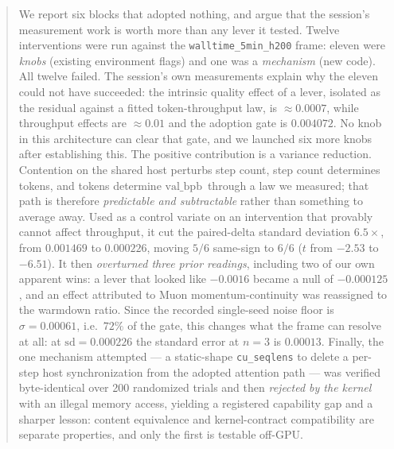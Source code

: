 \documentclass{article}
\newcommand{\valbpb}{\mathrm{val\_bpb}}
\begin{document}
\printAffiliationsAndNotice{}

\begin{abstract}
We report six blocks that adopted nothing, and argue that the session's measurement work is worth more than any lever it tested. Twelve interventions were run against the \texttt{walltime\_5min\_h200} frame: eleven were \emph{knobs} (existing environment flags) and one was a \emph{mechanism} (new code). All twelve failed. The session's own measurements explain why the eleven could not have succeeded: the intrinsic quality effect of a lever, isolated as the residual against a fitted token-throughput law, is $\approx 0.0007$, while throughput effects are $\approx 0.01$ and the adoption gate is $0.004072$. No knob in this architecture can clear that gate, and we launched six more knobs after establishing this. The positive contribution is a variance reduction. Contention on the shared host perturbs step count, step count determines tokens, and tokens determine $\valbpb$\ through a law we measured; that path is therefore \emph{predictable and subtractable} rather than something to average away. Used as a control variate on an intervention that provably cannot affect throughput, it cut the paired-delta standard deviation $6.5\times$, from $0.001469$ to $0.000226$, moving $5/6$ same-sign to $6/6$ ($t$ from $-2.53$ to $-6.51$). It then \emph{overturned three prior readings}, including two of our own apparent wins: a lever that looked like $-0.0016$ became a null of $-0.000125$, and an effect attributed to Muon momentum-continuity was reassigned to the warmdown ratio. Since the recorded single-seed noise floor is $\sigma = 0.00061$, i.e.\ $72\%$ of the gate, this changes what the frame can resolve at all: at $\mathrm{sd} = 0.000226$ the standard error at $n{=}3$ is $0.00013$. Finally, the one mechanism attempted --- a static-shape \texttt{cu\_seqlens} to delete a per-step host synchronization from the adopted attention path --- was verified byte-identical over 200 randomized trials and then \emph{rejected by the kernel} with an illegal memory access, yielding a registered capability gap and a sharper lesson: content equivalence and kernel-contract compatibility are separate properties, and only the first is testable off-GPU.
\end{abstract}
\end{document}
